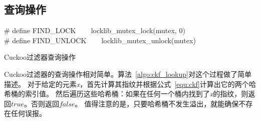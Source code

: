 \subsection{查询操作}

\begin{algorithm}[htbp]
\SetAlgoLined
\# define FIND\_LOCK ~~~ locklib\_mutex\_lock(mutex, 0)\\
\# define FIND\_UNLOCK ~~~ locklib\_mutex\_unlock(mutex)\\
\caption{Cuckoo过滤器查询操作}
\label{algo:ckf_lookup}
\end{algorithm}
Cuckoo过滤器的查询操作相对简单。算法~\ref{algo:ckf_lookup}对这个过程做了简单描述。
对于给定的元素\textit{x}，首先计算其指纹并根据公式~\ref{equ:ckf}计算出它的两个哈希桶的索引值。
然后遍历这些哈希桶：如果在任何一个桶内找到了\textit{x}的指纹，则返回$true$。否则返回$false$。
值得注意的是，只要哈希桶不发生溢出，就能确保不存在任何误报。


